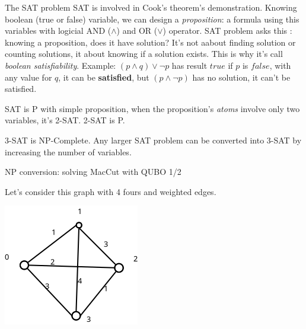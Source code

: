 \begin{frame}{The SAT problem}
SAT is involved in Cook's theorem's demonstration. Knowing boolean (true or false) variable, we can design a 
\textit{proposition}: a formula using this variables with logicial AND ($\land$) and OR ($\lor$) operator. 
\newline
SAT problem asks this : knowing a proposition, does it have solution? It's not aabout finding solution or counting solutions,
it about knowing if a solution exists. This is why it's call \textit{boolean satisfiability}.
\newline
Example:  $(p\land q)\lor \lnot p$ has result $true$ if $p$ is $false$, with any value for $q$, it can be \textbf{satisfied},
but $(p\land \lnot p)$ has no solution, it can't be satisfied. 

SAT is P with simple proposition, when the proposition's \textit{atoms} involve only two variables, it's 2-SAT. 2-SAT is P.

3-SAT is NP-Complete. Any larger SAT problem can be converted into 3-SAT by increasing the number of variables. 

\end{frame}

\begin{frame}{NP conversion: solving MacCut with QUBO 1/2}

Let's consider this graph with 4 fours and weighted edges.

\centering
\includegraphics[scale=0.7]{images/graph4pt.png}
\end{frame}

